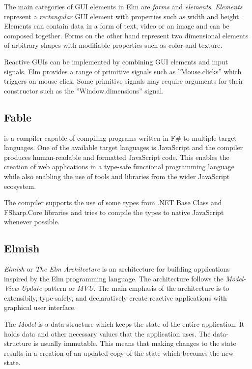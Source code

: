 The main categories of GUI elements in Elm are \emph{forms} and \emph{elements}.
\emph{Elements} represent a \emph{rectangular} GUI element with properties such as width and height. Elements
can contain data in a form of text, video or an image and can be composed together.
Forms on the other hand represent two dimensional elements of arbitrary shapes with
modifiable properties such as color and texture.

Reactive GUIs can be implemented by combining GUI elements and input signals.
Elm provides a range of primitive signals such as ”Mouse.clicks” which triggers on
mouse click. Some primitive signals may require arguments for their constructor such
as the ”Window.dimensions” signal.

\subsection{Fable}
\label{sub:Fable}
\citet{fable} is a compiler capable of compiling programs written in F\# to multiple
target languages. One of the available target languages is JavaScript and the compiler
produces human-readable and formatted JavaScript code. This enables the creation of
web applications in a type-safe functional programming language while also enabling
the use of tools and libraries from the wider JavaScript ecosystem.

The compiler supports the use of some types from .NET Base Class and FSharp.Core
libraries \cite{fable-comp} and tries to compile the types to native JavaScript whenever possible.

\subsection{Elmish}
\label{sub:elmish}

\emph{Elmish} or \emph{The Elm Architecture}\cite{eml-arch} is an architecture for building applications inspired
by the Elm programming language. The architecture follows the \emph{Model-View-Update}
pattern or \emph{MVU}. The main emphasis of the architecture is to extensibily, type-safely,
and declaratively create reactive applications with graphical user interface.


The \emph{Model} is a data-structure which keeps the state of the entire application. It
holds data and other necessary values that the application uses.
The data-structure is usually immutable.
This means that making changes to the state results in a creation
of an updated copy of the state which becomes the new state.

